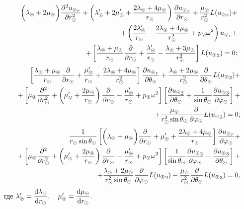 \begin{equation}\label{eq_1.1}
\begin{split}
\biggl(\la\l+2\mu\l\biggr)\fr{\de^2 {u\l}_r}{\de r\s^2} + \left(\la'\l+2\mu'\l+\fr{2\la\l+4\mu\l}{r\s}\right)\fr{\de {u\l}_r}{\de r\s} + \fr{\mu\l}{r\s^2}L({u\l}_r) +\\
+ \left(\fr{2\la'\l}{r\s} - \fr{2\la\l+4\mu\l}{r\s^2} + p\l\om^2\right){u\l}_r +\\
+ \left[\fr{\la\l+\mu\l}{r\s}\fr{\de}{\de r\s} + \fr{\la'\l}{r\s} - \fr{\la\l+3\mu\l}{r\s^2}\right]L({u\l}_2) = 0;
\end{split}
\end{equation}
\begin{equation}\label{eq_2.1}
\begin{split}
\left[\fr{\la\l+\mu\l}{r\s}\fr{\de}{\de r\s}+\fr{\mu'\l}{r\s}+\fr{2\la\l+4\mu\l}{r\s^2}\right]\fr{\de{u\l}_r}{\de \Q\s} + \fr{\la\l+2\mu\l}{r\s^2}\fr{\de}{\de \Q\s}L({u\l}_2) + \\
+ \left[\mu\l\fr{\de^2}{\de r\s^2} + \left(\mu'\l+\fr{2\mu\l}{r\s}\right)\fr{\de}{\de r\s} - \fr{\mu'\l}{r\s} + p\l\om^2\right]\left[\fr{\de {u\l}_2}{\de\Q\s} + \fr{1}{\sin\Q\s}\fr{\de{u\l}_3}{\de\f\s}\right]+\\
+ \fr{\mu\l}{r\s^2\sin\Q\s}\fr{\de}{\de\f\s}L({u\l}_3) = 0;
\end{split}
\end{equation}
\begin{equation}\label{eq_3.1}
\begin{split}
\fr{1}{r\s\sin\Q\s}\left[\biggl(\la\l+\mu\l\biggr)\fr{\de}{\de r\s} + \mu'\l + \fr{2\la\l+4\mu\l}{r\s}\right]\fr{\de {u\l}_r}{\de\f\s} +\\
+ \left[\mu\l\fr{\de^2}{\de r\s^2} + \left(\mu'\l+\fr{2\mu\l}{r\s}\right)\fr{\de}{\de r\s} - \fr{\mu'\l}{r\s} + p\l\om^2\right]\left[\fr{1}{\sin\Q\s}\fr{\de {u\l}_2}{\de\f\s} - \fr{\de {u\l}_3}{\de\Q\s}\right] +\\
+ \fr{\la\l+2\mu\l}{r\s^2\sin\Q\s}\fr{\de}{\de \f\s}L({u\l}_2) -\fr{\mu\l}{r\s^2}\fr{\de}{\de\Q\s}L({u\l}_3) = 0,
\end{split}
\end{equation}
где $\la'\l = \df{\diff\la\l}{\diff r\s},\q\mu'\l = \df{\diff\mu\l}{\diff r\s}.$
 
